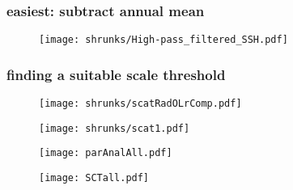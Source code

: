 \begin{frame}[noframenumbering]
\frametitle{easiest: subtract annual mean}
\begin{figure}
	\centering
\texttt{[image: shrunks/High-pass\_filtered\_SSH.pdf]}
\end{figure}
\end{frame}





\begin{frame}
\frametitle{finding a suitable scale threshold}
\begin{figure}
	\centering
\texttt{[image: shrunks/scatRadOLrComp.pdf]}
\end{figure}
\end{frame}

\begin{frame}[noframenumbering]
\begin{figure}
	\centering
\texttt{[image: shrunks/scat1.pdf]}
\end{figure}
\end{frame}

\begin{frame}[noframenumbering]
\begin{figure}
	\centering
\texttt{[image: parAnalAll.pdf]}
\end{figure}
\end{frame}


\begin{frame}[noframenumbering]
\begin{figure}
	\centering
	\texttt{[image: SCTall.pdf]}
\end{figure}
\end{frame}









